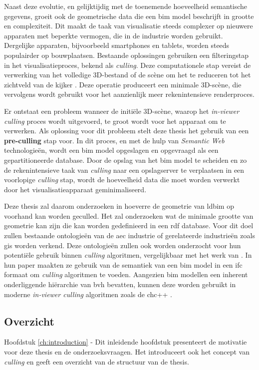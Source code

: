 \begin{refsection}
\begin{multicols}{2}
        Naast deze evolutie, en gelijktijdig met de toenemende hoeveelheid semantische gegevens, groeit ook de geometrische data die een \ac{bim} model beschrijft in grootte en complexiteit. Dit maakt de taak van visualisatie steeds complexer op nieuwere apparaten met beperkte vermogen, die in de industrie worden gebruikt. Dergelijke apparaten, bijvoorbeeld smartphones en tablets, worden steeds populairder op bouwplaatsen. Bestaande oplossingen gebruiken een filteringstap in het visualisatieproces, bekend als \emph{culling}. Deze computationele stap vereist de verwerking van het volledige 3D-bestand of de scène om het te reduceren tot het zichtveld van de kijker \parencite{Johansson2015}. Deze operatie produceert een minimale 3D-scène, die vervolgens wordt gebruikt voor het aanzienlijk meer rekenintensieve renderproces.

        Er ontstaat een probleem wanneer de initiële 3D-scène, waarop het \emph{in-viewer culling} proces wordt uitgevoerd, te groot wordt voor het apparaat om te verwerken. Als oplossing voor dit probleem stelt deze thesis het gebruik van een \textbf{pre-culling} stap voor. In dit proces, en met de hulp van \emph{Semantic Web} technologieën, wordt een \ac{bim} model opgeslagen en opgevraagd als een gepartitioneerde database. Door de opslag van het \ac{bim} model te scheiden en zo de rekenintensieve taak van \emph{culling} naar een opslagserver te verplaatsen in een voorlopige \emph{culling} stap, wordt de hoeveelheid data die moet worden verwerkt door het visualisatieapparaat geminimaliseerd.

        Deze thesis zal daarom onderzoeken in hoeverre de geometrie van \ac{ldbim} op voorhand kan worden geculled. Het zal onderzoeken wat de minimale grootte van geometrie kan zijn die kan worden gedefinieerd in een \ac{rdf} database. Voor dit doel zullen bestaande ontologieën van de \ac{aec} industrie of gerelateerde industrieën zoals \ac{gis} worden verkend. Deze ontologieën zullen ook worden onderzocht voor hun potentiële gebruik binnen \emph{culling} algoritmen, vergelijkbaar met het werk van \cite{Johansson2009}. In hun paper maakten ze gebruik van de semantiek van een \ac{bim} model in een \ac{ifc} formaat om \emph{culling} algoritmen te voeden. Aangezien \ac{bim} modellen een inherent onderliggende hiërarchie van \ac{bvh} bevatten, kunnen deze worden gebruikt in moderne \emph{in-viewer culling} algoritmen zoals de \ac{chc}++ \parencite{Johansson2015}.

        \subsection*{Overzicht}
        \textsf{Hoofdstuk \ref{ch:introduction} -}
        Dit inleidende hoofdstuk presenteert de motivatie voor deze thesis en de onderzoeksvraagen. Het introduceert ook het concept van \emph{culling} en geeft een overzicht van de structuur van de thesis.


\end{multicols}
\end{refsection}
